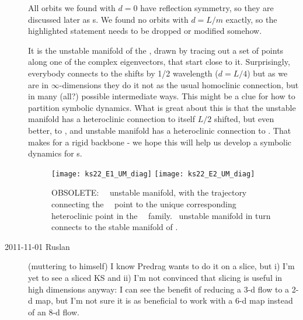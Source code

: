 \begin{description}

{All orbits we found with $d = 0$ have reflection symmetry,
so they are discussed later as \po s.  We found no orbits with
$d = L/m$ exactly, so the highlighted statement needs to be dropped or
modified somehow.}

 It is the unstable manifold of the 
{\eqv}, drawn by tracing out a set of points along one of the complex
eigenvectors, that start close to it. Surprisingly, everybody connects
to the  shifts by 1/2 wavelength ($d = L/4$) but as we are in
$\infty$-dimensions they do it not as the usual homoclinic connection, but in
many (all?) possible intermediate ways. This might be a clue for how to
partition symbolic dynamics.
What is great about
this is that the  unstable manifold has a heteroclinic connection to itself
$L/2$ shifted, but
even better, to , and  unstable manifold has a heteroclinic
connection to .
That makes for a rigid backbone -
we hope this will help us develop a symbolic dynamics for \rpo s.

\begin{figure} [t]
\begin{center}
\texttt{[image: ks22\_E1\_UM\_diag]}
\texttt{[image: ks22\_E2\_UM\_diag]}
\end{center}
\caption[OBSOLETE: EQV{1}~\eqv\ unstable manifold]
        {OBSOLETE:
~\eqv\ unstable manifold,
    with the trajectory connecting the
~\eqv\ point to the unique corresponding heteroclinic
point in the ~\eqv\ family.
~unstable manifold in turn connects  to the
stable manifold of .
        }
\label{f:KS22cage}
\end{figure}

\item[2011-11-01 Ruslan] (muttering to himself)             \toCB
I know Predrag wants to do it on a slice, but
i) I'm yet to see a sliced KS and
ii) I'm not convinced that slicing is useful in high dimensions anyway:
I can see the benefit of reducing a 3-d flow to a 2-d map, but I'm not
sure it is as beneficial to work with a 6-d map instead of an 8-d flow.


\end{description}
